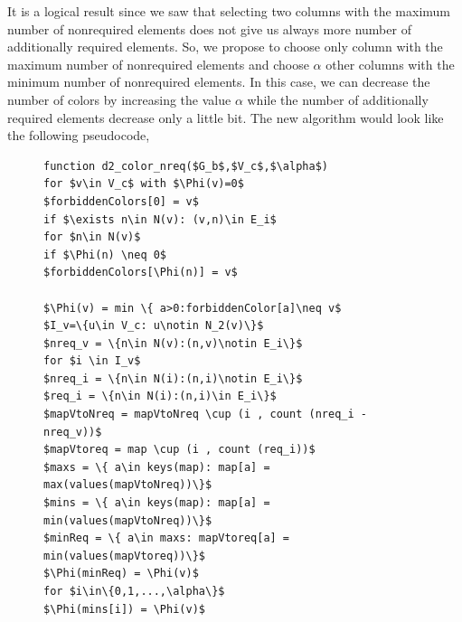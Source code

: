 \documentclass[12pt, twoside]{book}
\begin{document}
It is a logical result since we saw that selecting two columns with the maximum number of nonrequired
elements does not give us always more number of additionally required elements.
So, we propose to choose only column with the maximum number of nonrequired elements and
choose $\alpha$ other columns with the minimum number of nonrequired elements. In this case,
we can decrease the number of colors by increasing the value $\alpha$ while the number of
additionally required elements decrease only a little bit.
The new algorithm would look like the following pseudocode,
\begin{figure}
\begin{lstlisting}[caption=New coloring heuristc with a controller to balance the number of colors and the number of additionally required elements.,label=code.new.impr2,mathescape]
function d2_color_nreq($G_b$,$V_c$,$\alpha$)
for $v\in V_c$ with $\Phi(v)=0$
$forbiddenColors[0] = v$
if $\exists n\in N(v): (v,n)\in E_i$
for $n\in N(v)$
if $\Phi(n) \neq 0$
$forbiddenColors[\Phi(n)] = v$

$\Phi(v) = min \{ a>0:forbiddenColor[a]\neq v$
$I_v=\{u\in V_c: u\notin N_2(v)\}$
$nreq_v = \{n\in N(v):(n,v)\notin E_i\}$
for $i \in I_v$
$nreq_i = \{n\in N(i):(n,i)\notin E_i\}$
$req_i = \{n\in N(i):(n,i)\in E_i\}$
$mapVtoNreq = mapVtoNreq \cup (i , count (nreq_i - nreq_v))$
$mapVtoreq = map \cup (i , count (req_i))$
$maxs = \{ a\in keys(map): map[a] = max(values(mapVtoNreq))\}$
$mins = \{ a\in keys(map): map[a] = min(values(mapVtoNreq))\}$
$minReq = \{ a\in maxs: mapVtoreq[a] = min(values(mapVtoreq))\}$
$\Phi(minReq) = \Phi(v)$
for $i\in\{0,1,...,\alpha\}$
$\Phi(mins[i]) = \Phi(v)$
\end{lstlisting}
\end{figure}
\end{document}
